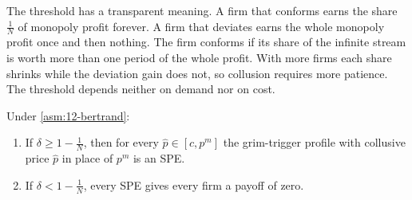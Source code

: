 The threshold has a transparent meaning. A firm that conforms earns the share $\frac{1}{N}$ of monopoly profit
forever. A firm that deviates earns the whole monopoly profit once and then nothing. The firm conforms if its share
of the infinite stream is worth more than one period of the whole profit. With more firms each share shrinks while the
deviation gain does not, so collusion requires more patience. The threshold depends neither on demand nor on cost.

\begin{corollary}\label{cor:12-bertrand-any-price}
Under \cref{asm:12-bertrand}:
\begin{enumerate}[label=(\roman*)]
\item If $\delta \ge 1 - \frac{1}{N}$, then for every $\hat p \in [c, p^m]$ the grim-trigger profile with collusive
  price $\hat p$ in place of $p^m$ is an SPE.
\item If $\delta < 1 - \frac{1}{N}$, every SPE gives every firm a payoff of zero.
\end{enumerate}
\end{corollary}

